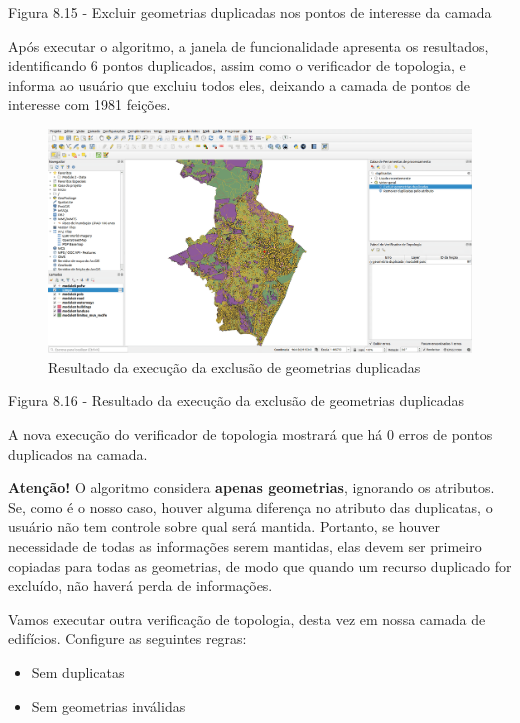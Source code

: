 \documentclass[
]{krantz}
\providecommand{\tightlist}{%
  \setlength{\itemsep}{0pt}\setlength{\parskip}{0pt}}
\begin{document}
Figura 8.15 - Excluir geometrias duplicadas nos pontos de interesse da camada

Após executar o algoritmo, a janela de funcionalidade apresenta os resultados, identificando 6 pontos duplicados, assim como o verificador de topologia, e informa ao usuário que excluiu todos eles, deixando a camada de pontos de interesse com 1981 feições.

\begin{figure}
\centering
\includegraphics{media/modulo8/fig816.png}
\caption{Resultado da execução da exclusão de geometrias duplicadas}
\end{figure}

Figura 8.16 - Resultado da execução da exclusão de geometrias duplicadas

A nova execução do verificador de topologia mostrará que há 0 erros de pontos duplicados na camada.

\textbf{Atenção!} O algoritmo considera \textbf{apenas geometrias}, ignorando os atributos. Se, como é o nosso caso, houver alguma diferença no atributo das duplicatas, o usuário não tem controle sobre qual será mantida. Portanto, se houver necessidade de todas as informações serem mantidas, elas devem ser primeiro copiadas para todas as geometrias, de modo que quando um recurso duplicado for excluído, não haverá perda de informações.

Vamos executar outra verificação de topologia, desta vez em nossa camada de edifícios. Configure as seguintes regras:

\begin{itemize}
\tightlist
\item
  Sem duplicatas
\item
  Sem geometrias inválidas
\end{itemize}
\end{document}
